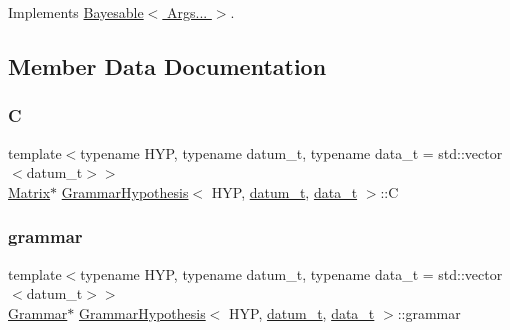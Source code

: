 Implements \hyperlink{class_bayesable_afcea9b439bcf321d5354710d8861cb54}{Bayesable$<$ Args... $>$}.



\subsection{Member Data Documentation}
\mbox{\label{class_grammar_hypothesis_a687b9ff3ffd2c19439707530a5ace6f2}} 
\subsubsection{\texorpdfstring{C}{C}}
{\footnotesize\ttfamily template$<$typename H\+YP, typename datum\+\_\+t, typename data\+\_\+t = std\+::vector$<$datum\+\_\+t$>$$>$ \\
\hyperlink{_eigen_numerics_8h_a645222978e81acfb2523a9bce34aecc0}{Matrix}$\ast$ \hyperlink{class_grammar_hypothesis}{Grammar\+Hypothesis}$<$ H\+YP, \hyperlink{class_bayesable_a9f1a6c0cd7855550fa10b1a8f13a5867}{datum\+\_\+t}, \hyperlink{class_bayesable_aa2788c4d7718c0a824e1d28c4c98f921}{data\+\_\+t} $>$\+::C}

\mbox{\label{class_grammar_hypothesis_a33e2e7cbb1cbf31c5ec87216ac0494e1}} 
\subsubsection{\texorpdfstring{grammar}{grammar}}
{\footnotesize\ttfamily template$<$typename H\+YP, typename datum\+\_\+t, typename data\+\_\+t = std\+::vector$<$datum\+\_\+t$>$$>$ \\
\hyperlink{class_grammar}{Grammar}$\ast$ \hyperlink{class_grammar_hypothesis}{Grammar\+Hypothesis}$<$ H\+YP, \hyperlink{class_bayesable_a9f1a6c0cd7855550fa10b1a8f13a5867}{datum\+\_\+t}, \hyperlink{class_bayesable_aa2788c4d7718c0a824e1d28c4c98f921}{data\+\_\+t} $>$\+::grammar}

\mbox{\label{class_grammar_hypothesis_a39667d9ed2d286c993e28c68e26ddf23}} 
